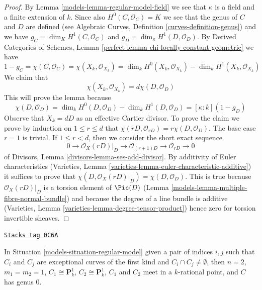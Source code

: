 \begin{proof}

By Lemma \ref{models-lemma-regular-model-field} we see that $\kappa$ is a field
and a finite extension of $k$. Since also $H^0(C, \mathcal{O}_C) = K$
we see that the genus of $C$ and $D$ are defined (see
Algebraic Curves, Definition \ref{curves-definition-genus}) and
we have $g_C = \dim_K H^1(C, \mathcal{O}_C)$ and
$g_D = \dim_\kappa H^1(D, \mathcal{O}_D)$.
By Derived Categories of Schemes, Lemma
\ref{perfect-lemma-chi-locally-constant-geometric}
we have
$$
1 - g_C = \chi(C, \mathcal{O}_C) =
\chi(X_k, \mathcal{O}_{X_k}) = \dim_k H^0(X_k, \mathcal{O}_{X_k})
- \dim_k H^1(X_k, \mathcal{O}_{X_k})
$$
We claim that
$$
\chi(X_k, \mathcal{O}_{X_k}) = d \chi(D, \mathcal{O}_D)
$$
This will prove the lemma because
$$
\chi(D, \mathcal{O}_D) =
\dim_k H^0(D, \mathcal{O}_D) - \dim_k H^1(D, \mathcal{O}_D) =
[\kappa : k](1 - g_D)
$$
Observe that $X_k = dD$ as an effective Cartier divisor.
To prove the claim we prove by induction on $1 \leq r \leq d$ that
$\chi(rD, \mathcal{O}_{rD}) = r \chi(D, \mathcal{O}_D)$.
The base case $r = 1$ is trivial. If $1 \leq r < d$, then we consider
the short exact sequence
$$
0 \to \mathcal{O}_X(rD)|_D \to \mathcal{O}_{(r + 1)D} \to
\mathcal{O}_{rD} \to 0
$$
of Divisors, Lemma \ref{divisors-lemma-ses-add-divisor}. By additivity
of Euler characteristics
(Varieties, Lemma \ref{varieties-lemma-euler-characteristic-additive})
it suffices to prove that
$\chi(D, \mathcal{O}_X(rD)|_D) = \chi(D, \mathcal{O}_D)$.
This is true because $\mathcal{O}_X(rD)|_D$ is a torsion
element of $\Pic(D)$ (Lemma \ref{models-lemma-multiple-fibre-normal-bundle})
and because the degree of a line bundle is additive
(Varieties, Lemma \ref{varieties-lemma-degree-tensor-product})
hence zero for torsion invertible sheaves.
\end{proof}

\begin{lemma}
\label{models-lemma-exceptional-curves-dont-meet}
\href{https://stacks.math.columbia.edu/tag/0C6A}{\texttt{Stacks tag 0C6A}}

In Situation \ref{models-situation-regular-model} given a pair of indices $i, j$
such that $C_i$ and $C_j$ are exceptional curves of the first kind
and $C_i \cap C_j \not = \emptyset$, then
$n = 2$, $m_1 = m_2 = 1$, $C_1 \cong \mathbf{P}^1_k$,
$C_2 \cong \mathbf{P}^1_k$, $C_1$ and $C_2$ meet in a $k$-rational point,
and $C$ has genus $0$.
\end{lemma}


